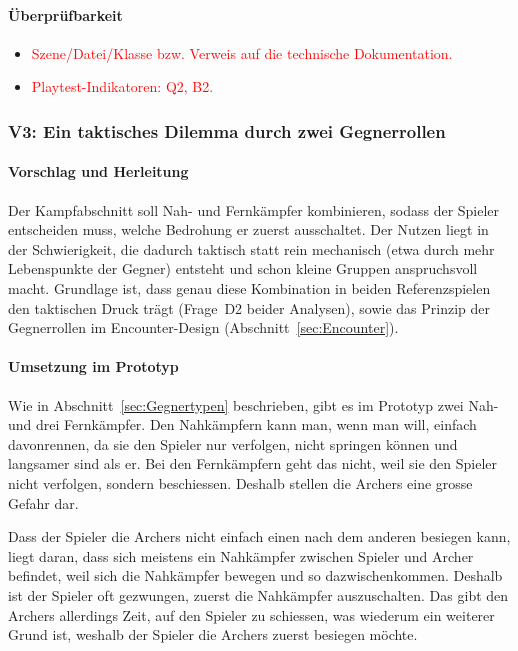 \documentclass[../Main.tex]{subfiles}
\begin{document}
\paragraph{Überprüfbarkeit}
\begin{itemize}[leftmargin=1.5cm]
    \item \textcolor{red}{Szene/Datei/Klasse bzw. Verweis auf die technische Dokumentation.}
    \item \textcolor{red}{Playtest-Indikatoren: Q2, B2.}
\end{itemize}

\subsubsection{V3: Ein taktisches Dilemma durch zwei Gegnerrollen} \label{sec:V3}

\paragraph{Vorschlag und Herleitung}
Der Kampfabschnitt soll Nah- und Fernkämpfer kombinieren, sodass der Spieler entscheiden muss, welche Bedrohung er zuerst ausschaltet. Der Nutzen liegt in der Schwierigkeit, die dadurch taktisch statt rein mechanisch (etwa durch mehr Lebenspunkte der Gegner) entsteht und schon kleine Gruppen anspruchsvoll macht. Grundlage ist, dass genau diese Kombination in beiden Referenzspielen den taktischen Druck trägt (Frage~D2 beider Analysen), sowie das Prinzip der Gegnerrollen im Encounter-Design (Abschnitt~\ref{sec:Encounter}).

\paragraph{Umsetzung im Prototyp}
Wie in Abschnitt~\ref{sec:Gegnertypen} beschrieben, gibt es im Prototyp zwei Nah- und drei Fernkämpfer. Den Nahkämpfern kann man, wenn man will, einfach davonrennen, da sie den Spieler nur verfolgen, nicht springen können und langsamer sind als er. Bei den Fernkämpfern geht das nicht, weil sie den Spieler nicht verfolgen, sondern beschiessen. Deshalb stellen die Archers eine grosse Gefahr dar.

Dass der Spieler die Archers nicht einfach einen nach dem anderen besiegen kann, liegt daran, dass sich meistens ein Nahkämpfer zwischen Spieler und Archer befindet, weil sich die Nahkämpfer bewegen und so dazwischenkommen. Deshalb ist der Spieler oft gezwungen, zuerst die Nahkämpfer auszuschalten. Das gibt den Archers allerdings Zeit, auf den Spieler zu schiessen, was wiederum ein weiterer Grund ist, weshalb der Spieler die Archers zuerst besiegen möchte.
\end{document}
